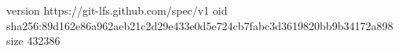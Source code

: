 version https://git-lfs.github.com/spec/v1
oid sha256:89d162e86a962aeb21c2d29e433e0d5e724cb7fabc3d3619820bb9b34172a898
size 432386
